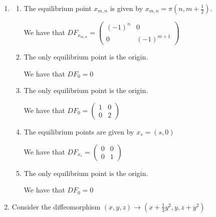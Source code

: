\documentclass{article}
\begin{document}
\begin{enumerate}
    \item 
    
    \begin{enumerate}
        
        \item The equilibrium point $x_{m,n}$ is given by $x_{m,n}=\pi(n,m+\frac{1}{2})$. 

        We have that $DF_{x_{m,n}}=\begin{pmatrix}
(-1)^n & 0\\
0 & (-1)^{m+1} 
\end{pmatrix}$

        \item The only equilibrium point is the origin.

        We have that $DF_0=0$

        \item The only equilibrium point is the origin.

        We have that $DF_0=\begin{pmatrix}
            1 & 0 \\
            0 & 2
        \end{pmatrix}$

        \item The equilibrium points are given by $x_s=(s,0)$

        We have that $DF_{x_s}=\begin{pmatrix}
            0 & 0\\
            0 & 1
        \end{pmatrix}$

        \item The only equilibrium point is the origin.

        We have that $DF_0=0$
    
    \end{enumerate}

    \item Consider the diffeomorphism $(x,y,z) \to (x+\frac{1}{3}y^2,y,z+y^2)$

    
\end{enumerate}
\end{document}
